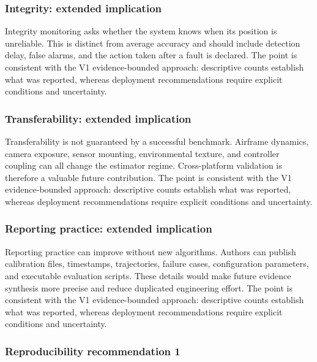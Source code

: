 \documentclass[
  journal,
  10pt]{IEEEtran}
\begin{document}
\subsubsection{Integrity: extended
implication}\label{integrity-extended-implication}

Integrity monitoring asks whether the system knows when its position is
unreliable. This is distinct from average accuracy and should include
detection delay, false alarms, and the action taken after a fault is
declared. The point is consistent with the V1 evidence-bounded approach:
descriptive counts establish what was reported, whereas deployment
recommendations require explicit conditions and uncertainty.

\subsubsection{Transferability: extended
implication}\label{transferability-extended-implication}

Transferability is not guaranteed by a successful benchmark. Airframe
dynamics, camera exposure, sensor mounting, environmental texture, and
controller coupling can all change the estimator regime. Cross-platform
validation is therefore a valuable future contribution. The point is
consistent with the V1 evidence-bounded approach: descriptive counts
establish what was reported, whereas deployment recommendations require
explicit conditions and uncertainty.

\subsubsection{Reporting practice: extended
implication}\label{reporting-practice-extended-implication}

Reporting practice can improve without new algorithms. Authors can
publish calibration files, timestamps, trajectories, failure cases,
configuration parameters, and executable evaluation scripts. These
details would make future evidence synthesis more precise and reduce
duplicated engineering effort. The point is consistent with the V1
evidence-bounded approach: descriptive counts establish what was
reported, whereas deployment recommendations require explicit conditions
and uncertainty.

\subsubsection{Reproducibility recommendation
1}\label{reproducibility-recommendation-1}
\end{document}
